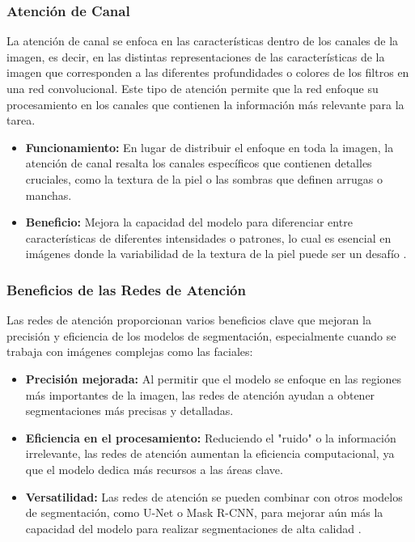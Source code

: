 \subsubsection{Atención de Canal}  
La atención de canal se enfoca en las características dentro de los canales de la imagen, es decir, en las distintas representaciones de las características de la imagen que corresponden a las diferentes profundidades o colores de los filtros en una red convolucional. Este tipo de atención permite que la red enfoque su procesamiento en los canales que contienen la información más relevante para la tarea.  
\begin{itemize}
    \item \textbf{Funcionamiento:} En lugar de distribuir el enfoque en toda la imagen, la atención de canal resalta los canales específicos que contienen detalles cruciales, como la textura de la piel o las sombras que definen arrugas o manchas.
    \item \textbf{Beneficio:} Mejora la capacidad del modelo para diferenciar entre características de diferentes intensidades o patrones, lo cual es esencial en imágenes donde la variabilidad de la textura de la piel puede ser un desafío \cite{autor2019canal}.
\end{itemize}

\subsubsection{Beneficios de las Redes de Atención}  
Las redes de atención proporcionan varios beneficios clave que mejoran la precisión y eficiencia de los modelos de segmentación, especialmente cuando se trabaja con imágenes complejas como las faciales:
\begin{itemize}
    \item \textbf{Precisión mejorada:} Al permitir que el modelo se enfoque en las regiones más importantes de la imagen, las redes de atención ayudan a obtener segmentaciones más precisas y detalladas.
    \item \textbf{Eficiencia en el procesamiento:} Reduciendo el "ruido" o la información irrelevante, las redes de atención aumentan la eficiencia computacional, ya que el modelo dedica más recursos a las áreas clave.
    \item \textbf{Versatilidad:} Las redes de atención se pueden combinar con otros modelos de segmentación, como U-Net o Mask R-CNN, para mejorar aún más la capacidad del modelo para realizar segmentaciones de alta calidad \cite{autor2021beneficios}.
\end{itemize}


